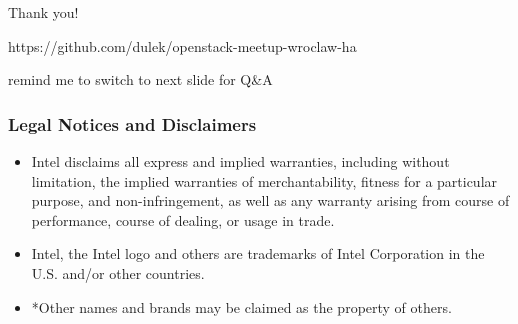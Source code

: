 \documentclass[aspectratio=43]{beamer}
\begin{document}
\begin{frame}
    \begin{center}
        \huge Thank you!

        \vfill

        \Large https://github.com/dulek/openstack-meetup-wroclaw-ha

        \vfill

        \small remind me to switch to next slide for Q\&A
    \end{center}
\end{frame}

\begin{frame}
    \frametitle{Legal Notices and Disclaimers}
    \begin{itemize}
\item Intel disclaims all express and implied warranties, including without
limitation, the implied warranties of merchantability, fitness for a particular
purpose, and non-infringement, as well as any warranty arising from course of
performance, course of dealing, or usage in trade.

\item Intel, the Intel logo and others are trademarks of Intel Corporation in the 
U.S. and/or other countries.

\item *Other names and brands may be claimed as the property of others.
    \end{itemize}
\end{frame}
\end{document}
